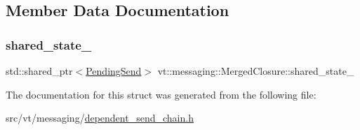 \subsection{Member Data Documentation}
\mbox{\label{structvt_1_1messaging_1_1_merged_closure_a5e595776f26d0b403464bbe3b94b3329}} 
\subsubsection{\texorpdfstring{shared\+\_\+state\+\_\+}{shared\_state\_}}
{\footnotesize\ttfamily std\+::shared\+\_\+ptr$<$\hyperlink{structvt_1_1messaging_1_1_pending_send}{Pending\+Send}$>$ vt\+::messaging\+::\+Merged\+Closure\+::shared\+\_\+state\+\_\+\hspace{0.3cm}{\ttfamily [private]}}



The documentation for this struct was generated from the following file\+:\begin{DoxyCompactItemize}
\item 
src/vt/messaging/\hyperlink{dependent__send__chain_8h}{dependent\+\_\+send\+\_\+chain.\+h}\end{DoxyCompactItemize}
